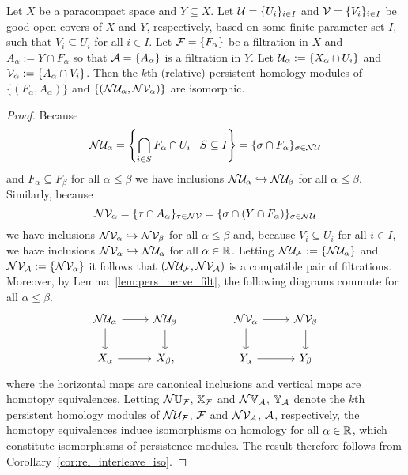 \begin{lemma}\label{lem:rel_pers_nerve}
  Let $X$ be a paracompact space and $Y\subseteq X$.
  Let $\mathcal{U} = \{U_i\}_{i\in I}$ and $\mathcal{V} = \{V_i\}_{i\in I}$ be good open covers of $X$ and $Y$, respectively, based on some finite parameter set $I$, such that $V_i\subseteq U_i$ for all $i\in I$.
  Let $\mathcal{F} = \{F_\alpha\}$ be a filtration in $X$ and $A_\alpha := Y\cap F_\alpha$ so that $\mathcal{A} = \{A_\alpha\}$ is a filtration in $Y$.
  Let $\mathcal{U}_\alpha := \{X_\alpha\cap U_i\}$ and $\mathcal{V}_\alpha := \{A_\alpha\cap V_i\}$.
  Then the $k$th (relative) persistent homology modules of $\{(F_\alpha, A_\alpha)\}$ and $\{(\mathcal{N}\mathcal{U}_\alpha, \mathcal{N}\mathcal{V}_\alpha)\}$ are isomorphic.
\end{lemma}
\begin{proof}
  Because
  \[\mathcal{N}\mathcal{U}_\alpha = \left\{\bigcap_{i\in S} F_\alpha\cap U_i\mid S\subseteq I\right\} = \{\sigma\cap F_\alpha\}_{\sigma\in \mathcal{N}\mathcal{U}}\]
  and $F_\alpha\subseteq F_\beta$ for all $\alpha\leq\beta$ we have inclusions $\mathcal{N}\mathcal{U}_\alpha\hookrightarrow\mathcal{N}\mathcal{U}_\beta$ for all $\alpha\leq\beta$.
  Similarly, because
  \[\mathcal{N}\mathcal{V}_\alpha = \{\tau\cap A_\alpha\}_{\tau\in \mathcal{N}\mathcal{V}} = \{\sigma\cap (Y\cap F_\alpha)\}_{\sigma\in\mathcal{N}\mathcal{U}}\]
  we have inclusions $\mathcal{N}\mathcal{V}_\alpha\hookrightarrow\mathcal{N}\mathcal{V}_\beta$ for all $\alpha\leq\beta$ and, because $V_i\subseteq U_i$ for all $i\in I$, we have inclusions $\mathcal{N}\mathcal{V}_\alpha\hookrightarrow \mathcal{N}\mathcal{U}_\alpha$ for all $\alpha\in\mathbb{R}$.
  Letting $\mathcal{N}\mathcal{U}_{\mathcal{F}} := \{\mathcal{N}\mathcal{U}_\alpha\}$ and $\mathcal{N}\mathcal{V}_{\mathcal{A}} := \{\mathcal{N}\mathcal{V}_\alpha\}$ it follows that $(\mathcal{N}\mathcal{U}_{\mathcal{F}}, \mathcal{N}\mathcal{V}_{\mathcal{A}})$ is a compatible pair of filtrations.
  Moreover, by Lemma~\ref{lem:pers_nerve_filt}, the following diagrams commute for all $\alpha\leq\beta$.
  \[\begin{tikzcd}
      \N\cU_\alpha \arrow{r}\arrow{d} &
      \N\cU_\beta \arrow{d}\\
      X_\alpha\arrow{r} &
      X_\beta,
    \end{tikzcd}\hspace{10ex}
    \begin{tikzcd}
      \N\cV_\alpha \arrow{r}\arrow{d} &
      \N\cV_\beta \arrow{d}\\
      Y_\alpha\arrow{r} &
      Y_\beta
    \end{tikzcd}\]
  where the horizontal maps are canonical inclusions and vertical maps are homotopy equivalences.
  Letting $\mathcal{N}\mathbb{U}_{\mathcal{F}}$, $\mathbb{X}_{\mathcal{F}}$ and $\mathcal{N}\mathbb{V}_{\mathcal{A}}$, $\mathbb{Y}_{\mathcal{A}}$ denote the $k$th persistent homology modules of $\mathcal{N}\mathcal{U}_{\mathcal{F}}$, $\mathcal{F}$ and $\mathcal{N}\mathcal{V}_{\mathcal{A}}$, $\mathcal{A}$, respectively, the homotopy equivalences induce isomorphisms on homology for all $\alpha\in\mathbb{R}$, which constitute isomorphisms of persistence modules.
  The result therefore follows from Corollary~\ref{cor:rel_interleave_iso}.
\end{proof}

